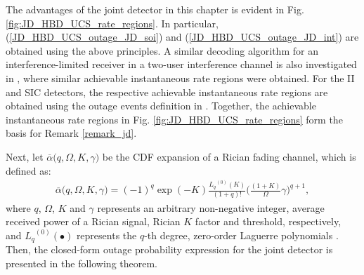 The advantages of the joint detector in this chapter is evident in Fig. \ref{fig:JD_HBD_UCS_rate_regions}. In particular, (\ref{JD_HBD_UCS_outage_JD_soi}) and (\ref{JD_HBD_UCS_outage_JD_int}) are obtained using the above principles. A similar decoding algorithm for an interference-limited receiver in a two-user interference channel is also investigated in \cite{bandemer2012simultaneous,nam2014advanced}, where similar achievable instantaneous rate regions were obtained. For the II and SIC detectors, the respective achievable instantaneous rate regions are obtained using the outage events definition in \cite{ernest2019outage}. Together, the achievable instantaneous rate regions in Fig. \ref{fig:JD_HBD_UCS_rate_regions} form the basis for Remark \ref{remark_jd}.

Next, let $\overline{\alpha}\big(q,\Omega,K,\gamma\big)$ be the CDF expansion of a Rician fading channel, which is defined as:
\begin{eqnarray} \label{JD_HBD_UCS_alpha_func}
\overline{\alpha}\big(q,\Omega,K,\gamma\big) = (-1)^q \exp(-K) \frac{{L_q}^{(0)}(K)}{(1+q)!} \Bigg(\frac{(1+K)}{\Omega}\gamma\Bigg)^{q+1},
\end{eqnarray}
where $q$, $\Omega$, $K$ and $\gamma$ represents an arbitrary non-negative integer, average received power of a Rician signal, Rician $K$ factor and threshold, respectively, and ${L_q}^{(0)}(\bullet)$ represents the $q$-th degree, zero-order Laguerre polynomials \cite{andras2011generalized}. Then, the closed-form outage probability expression for the joint detector is presented in the following theorem.

